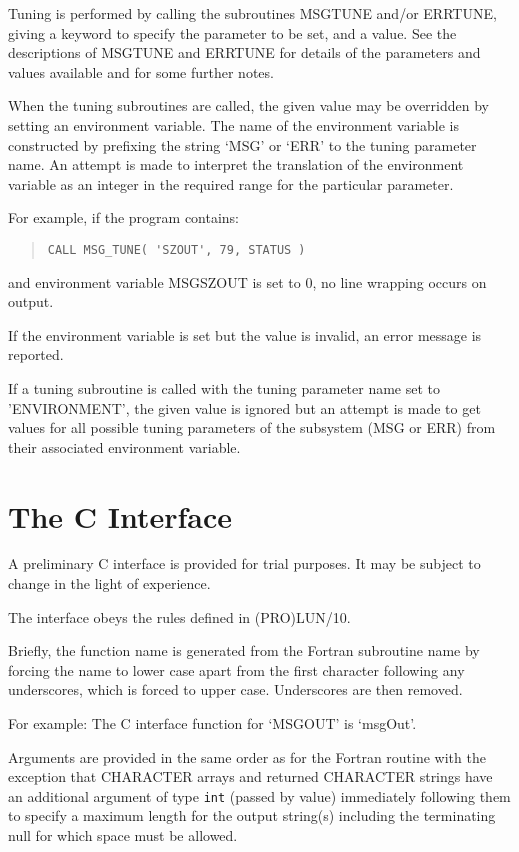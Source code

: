 \documentclass[twoside,11pt]{article}
\newcommand{\htmlref}[2]{#1}
\newcommand{\xlabel}[1]{}
\renewcommand{\_}{\texttt{\symbol{95}}}
\begin{document}
Tuning is performed by calling the subroutines MSG\_TUNE and/or ERR\_TUNE,
giving a keyword to specify the parameter to be set, and a value.
See the descriptions of
\htmlref{MSG\_TUNE}{MSG_TUNE} 
and
\htmlref{ERR\_TUNE}{ERR_TUNE}
for details of the parameters and values available and for some further notes.

When the tuning subroutines are called, the given value may be overridden by
setting an environment variable.  The name of the environment variable is
constructed by prefixing the string `MSG\_' or `ERR\_' to the tuning parameter
name. An attempt is made to interpret the translation of the environment
variable as an integer in the required range for the particular parameter.

For example, if the program contains:
\begin{quote} \begin{verbatim}
CALL MSG_TUNE( 'SZOUT', 79, STATUS )
\end{verbatim} \end{quote}
and environment variable MSG\_SZOUT is set to 0, no line wrapping occurs
on output.

If the environment variable is set but the value is invalid, an error message
is reported.

If a tuning subroutine is called with the tuning parameter name set to
'ENVIRONMENT', the given value is ignored but an attempt is made to get values
for all possible tuning parameters of the subsystem (MSG or ERR) from their 
associated environment variable.

\newpage
\section{\xlabel{the_c_interface}\label{the_c_interface}The C Interface}
A preliminary C interface is provided for trial purposes. It may be subject to
change in the light of experience.

The interface obeys the rules defined in (PRO)LUN/10.

Briefly, the function name is generated from the Fortran subroutine name by
forcing the name to lower case apart from the first character following any
underscores, which is forced to upper case. Underscores are then removed.

For example: The C interface function for `MSG\_OUT' is `msgOut'.

Arguments are provided in the same order as for the Fortran routine with the
exception that CHARACTER arrays and returned CHARACTER strings 
have an additional argument of type \texttt{int} (passed by value) immediately 
following them to specify a maximum length for the output string(s) including 
the terminating null for which space must be allowed. 
\end{document}
